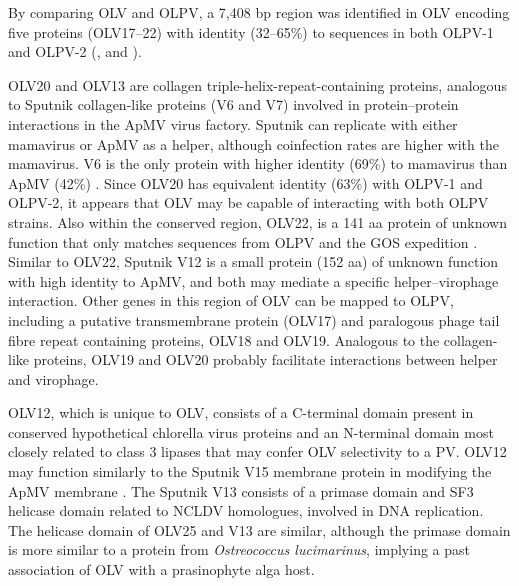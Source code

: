 By comparing \ac{OLV} and \ac{OLPV}, a 7,408 bp region was identified in \ac{OLV} encoding five proteins (OLV17--22) with identity (32--65\%) to sequences in both \ac{OLPV}-1 and \ac{OLPV}-2 (,  and ). 

OLV20 and OLV13 are collagen triple-helix-repeat-containing proteins, analogous to Sputnik collagen-like proteins (V6 and V7) involved in protein--protein interactions in the \ac{ApMV} virus factory. 
Sputnik can replicate with either mamavirus or \ac{ApMV} as a helper, although coinfection rates are higher with the mamavirus. 
V6 is the only protein with higher identity (69\%) to mamavirus than \ac{ApMV} (42\%) \cite{LaScola2008}. 
Since OLV20 has equivalent identity (63\%) with \ac{OLPV}-1 and \ac{OLPV}-2, it appears that \ac{OLV} may be capable of interacting with both \ac{OLPV} strains. 
Also within the conserved region, OLV22, is a 141 aa protein of unknown function that only matches sequences from \ac{OLPV} and the \ac{GOS} expedition . 
Similar to OLV22, Sputnik V12 is a small protein (152 aa) of unknown function with high identity to \ac{ApMV}, and both may mediate a specific helper--virophage interaction. 
Other genes in this region of \ac{OLV} can be mapped to \ac{OLPV}, including a putative transmembrane protein (OLV17) and paralogous phage tail fibre repeat containing proteins, OLV18 and OLV19. 
Analogous to the collagen-like proteins, OLV19 and OLV20 probably facilitate interactions between helper and virophage. 

OLV12, which is unique to \ac{OLV}, consists of a C-terminal domain present in conserved hypothetical chlorella virus proteins and an N-terminal domain most closely related to class 3 lipases that may confer \ac{OLV} selectivity to a \ac{PV}. 
OLV12 may function similarly to the Sputnik V15 membrane protein in modifying the \ac{ApMV} membrane \cite{LaScola2008}. 
The Sputnik V13 consists of a primase domain and SF3 helicase domain related to \ac{NCLDV} homologues, involved in \textsc{DNA} replication. 
The helicase domain of OLV25 and V13 are similar, although the primase domain is more similar to a protein from \emph{Ostreococcus lucimarinus}, implying a past association of \ac{OLV} with a prasinophyte alga host. 

